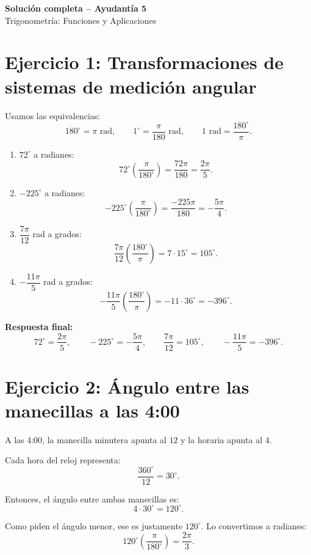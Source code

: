 \documentclass[12pt]{article}
\begin{document}
	
	\begin{center}
		{\LARGE \textbf{Solución completa -- Ayudantía 5}}\\[0.3em]
		{\large Trigonometría: Funciones y Aplicaciones}
	\end{center}
	
	\section*{Ejercicio 1: Transformaciones de sistemas de medición angular}
	Usamos las equivalencias:
	\[
	180^\circ = \pi \text{ rad}, \qquad 1^\circ = \frac{\pi}{180} \text{ rad}, \qquad 1\text{ rad} = \frac{180^\circ}{\pi}.
	\]
	
	\begin{enumerate}[label=\arabic*)]
		\item \(72^\circ\) a radianes:
		\[
		72^\circ\left(\frac{\pi}{180^\circ}\right)=\frac{72\pi}{180}=\frac{2\pi}{5}.
		\]
		
		\item \(-225^\circ\) a radianes:
		\[
		-225^\circ\left(\frac{\pi}{180^\circ}\right)=\frac{-225\pi}{180}=-\frac{5\pi}{4}.
		\]
		
		\item \(\dfrac{7\pi}{12}\) rad a grados:
		\[
		\frac{7\pi}{12}\left(\frac{180^\circ}{\pi}\right)=7\cdot 15^\circ=105^\circ.
		\]
		
		\item \(-\dfrac{11\pi}{5}\) rad a grados:
		\[
		-\frac{11\pi}{5}\left(\frac{180^\circ}{\pi}\right)=-11\cdot 36^\circ=-396^\circ.
		\]
	\end{enumerate}
	
	\textbf{Respuesta final:}
	\[
	72^\circ=\frac{2\pi}{5}, \qquad -225^\circ=-\frac{5\pi}{4}, \qquad \frac{7\pi}{12}=105^\circ, \qquad -\frac{11\pi}{5}=-396^\circ.
	\]
	
	\section*{Ejercicio 2: Ángulo entre las manecillas a las 4:00}
	A las 4:00, la manecilla minutera apunta al \(12\) y la horaria apunta al \(4\).
	
	Cada hora del reloj representa:
	\[
	\frac{360^\circ}{12}=30^\circ.
	\]
	
	Entonces, el ángulo entre ambas manecillas es:
	\[
	4\cdot 30^\circ=120^\circ.
	\]
	
	Como piden el ángulo menor, ese es justamente \(120^\circ\). Lo convertimos a radianes:
	\[
	120^\circ\left(\frac{\pi}{180^\circ}\right)=\frac{2\pi}{3}.
	\]
	
\end{document}
